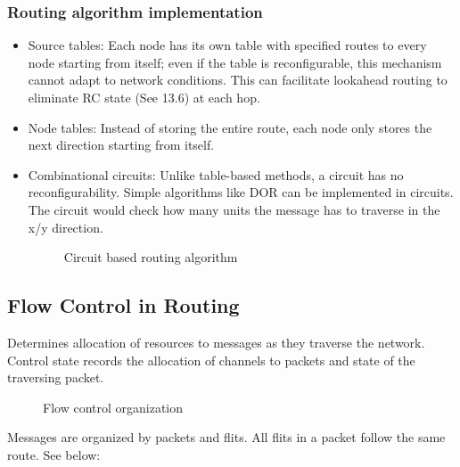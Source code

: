 \documentclass{article}
\begin{document}
\begin{multicols*}{2}
\subsubsection{Routing algorithm implementation}
\begin{itemize}
    \item Source tables: Each node has its own table with specified routes to every node starting from itself; even if the table is reconfigurable, this mechanism cannot adapt to network conditions. This can facilitate lookahead routing to eliminate RC state (See 13.6) at each hop.
    \item Node tables: Instead of storing the entire route, each node only stores the next direction starting from itself.
    \item Combinational circuits: Unlike table-based methods, a circuit has no reconfigurability. Simple algorithms like DOR can be implemented in circuits. The circuit would check how many units the message has to traverse in the x/y direction.
    \begin{figure}[H]
        \caption{Circuit based routing algorithm}
    \end{figure}      
\end{itemize}

\subsection{Flow Control in Routing}
Determines allocation of resources to messages as they traverse the network. Control state records the allocation of channels to packets and state of the traversing packet.
\begin{figure}[H]
    \caption{Flow control organization}
\end{figure}   
\noindent\newline
Messages are organized by packets and flits. All flits in a packet follow the same route. See below:


\end{multicols*}
\end{document}

